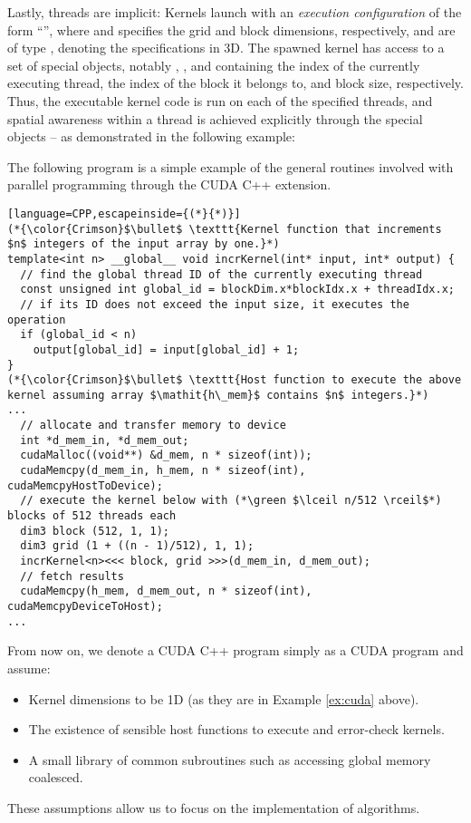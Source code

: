 Lastly, threads are implicit: Kernels launch with an \textit{execution
  configuration} of the form ``'', where
 and  specifies the grid and block dimensions,
respectively, and are of type , denoting the specifications in 3D. The
spawned kernel has access to a set of special objects, notably ,
, and  containing the index of the currently
executing thread, the index of the block it belongs to, and block size,
respectively. Thus, the executable kernel code is run on each of the specified
threads, and spatial awareness within a thread is achieved explicitly through
the special objects -- as demonstrated in the following example:

\begin{example}\label{ex:cuda}
  The following program is a simple example of the general routines
  involved with parallel programming through the CUDA C++ extension.
\begin{lstlisting}[language=CPP,escapeinside={(*}{*)}]
(*{\color{Crimson}$\bullet$ \texttt{Kernel function that increments $n$ integers of the input array by one.}*)
template<int n> __global__ void incrKernel(int* input, int* output) {
  // find the global thread ID of the currently executing thread
  const unsigned int global_id = blockDim.x*blockIdx.x + threadIdx.x;
  // if its ID does not exceed the input size, it executes the operation
  if (global_id < n)
    output[global_id] = input[global_id] + 1;
}
(*{\color{Crimson}$\bullet$ \texttt{Host function to execute the above kernel assuming array $\mathit{h\_mem}$ contains $n$ integers.}*)
...
  // allocate and transfer memory to device
  int *d_mem_in, *d_mem_out;
  cudaMalloc((void**) &d_mem, n * sizeof(int));
  cudaMemcpy(d_mem_in, h_mem, n * sizeof(int), cudaMemcpyHostToDevice);
  // execute the kernel below with (*\green $\lceil n/512 \rceil$*) blocks of 512 threads each
  dim3 block (512, 1, 1);
  dim3 grid (1 + ((n - 1)/512), 1, 1);
  incrKernel<n><<< block, grid >>>(d_mem_in, d_mem_out);
  // fetch results
  cudaMemcpy(h_mem, d_mem_out, n * sizeof(int), cudaMemcpyDeviceToHost);
...
\end{lstlisting}
\end{example}

From now on, we denote a CUDA C++ program simply as a CUDA program and assume:
\begin{itemize}
  \renewcommand\labelitemi{--}
\item Kernel dimensions to be 1D (as they are in Example \ref{ex:cuda} above).
\item The existence of sensible host functions to execute and error-check
  kernels.
\item A small library of common subroutines such as accessing global memory
  coalesced.
\end{itemize}
These assumptions allow us to focus on the implementation of algorithms.

